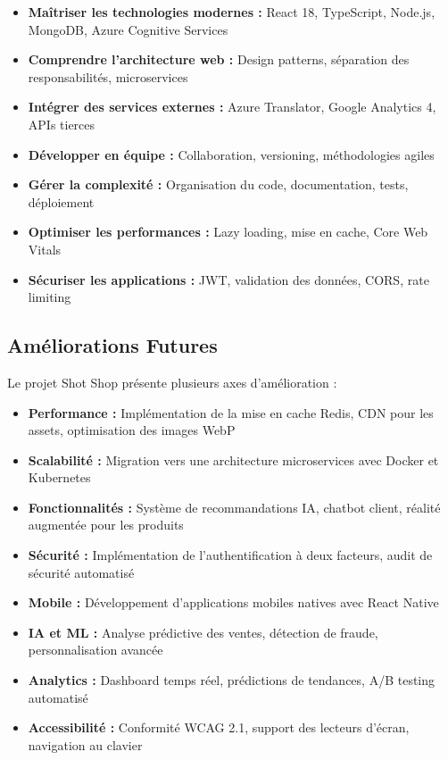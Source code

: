 \documentclass[12pt,a4paper]{article}
\begin{document}
\begin{itemize}
    \item \textbf{Maîtriser les technologies modernes :} React 18, TypeScript, Node.js, MongoDB, Azure Cognitive Services
    \item \textbf{Comprendre l'architecture web :} Design patterns, séparation des responsabilités, microservices
    \item \textbf{Intégrer des services externes :} Azure Translator, Google Analytics 4, APIs tierces
    \item \textbf{Développer en équipe :} Collaboration, versioning, méthodologies agiles
    \item \textbf{Gérer la complexité :} Organisation du code, documentation, tests, déploiement
    \item \textbf{Optimiser les performances :} Lazy loading, mise en cache, Core Web Vitals
    \item \textbf{Sécuriser les applications :} JWT, validation des données, CORS, rate limiting
\end{itemize}

\subsection{Améliorations Futures}
Le projet Shot Shop présente plusieurs axes d'amélioration :

\begin{itemize}
    \item \textbf{Performance :} Implémentation de la mise en cache Redis, CDN pour les assets, optimisation des images WebP
    \item \textbf{Scalabilité :} Migration vers une architecture microservices avec Docker et Kubernetes
    \item \textbf{Fonctionnalités :} Système de recommandations IA, chatbot client, réalité augmentée pour les produits
    \item \textbf{Sécurité :} Implémentation de l'authentification à deux facteurs, audit de sécurité automatisé
    \item \textbf{Mobile :} Développement d'applications mobiles natives avec React Native
    \item \textbf{IA et ML :} Analyse prédictive des ventes, détection de fraude, personnalisation avancée
    \item \textbf{Analytics :} Dashboard temps réel, prédictions de tendances, A/B testing automatisé
    \item \textbf{Accessibilité :} Conformité WCAG 2.1, support des lecteurs d'écran, navigation au clavier
\end{itemize}
\end{document}

